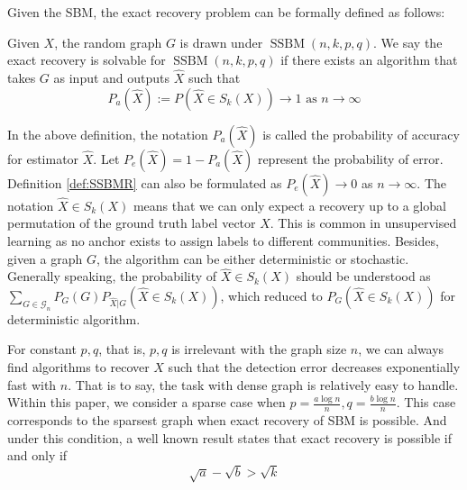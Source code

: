 \documentclass[entropy,article,submit,moreauthors,pdftex]{Definitions/mdpi}
\newcommand{\A}{\frac{a \log n}{n}}
\newcommand{\B}{\frac{b \log n}{n}}
\newcommand{\cG}{\mathcal{G}}
\newcommand{\1}{\mathbbm{1}}
\DeclareMathOperator{\SSBM}{SSBM}
\begin{document}
Given the SBM, the exact recovery problem can be formally defined as follows:
\begin{Definition} \label{def:SSBMR}
Given $X$, the random graph $G$ is drawn under $\SSBM(n,k,p,q)$. We say the exact recovery is solvable for $\SSBM(n,k,p,q)$ if there exists an algorithm that takes
$G$ as input and outputs $\hat{X}$ such that
\begin{equation*}
P_a(\hat{X}):=P(\hat{X} \in S_k(X)) \to 1 \textrm{ as } n \to \infty
\end{equation*}
\end{Definition}

In the above definition, the notation $P_a(\hat{X})$ is called the probability of accuracy for estimator $\hat{X}$.
Let $P_e(\hat{X}) = 1 - P_a(\hat{X})$ represent the probability of error. Definition \ref{def:SSBMR} can also
be formulated as $P_e(\hat{X}) \to 0$ as $n\to \infty$.
The notation $\hat{X} \in S_k(X)$ means that we can only
expect a recovery up to a global permutation of the ground truth label vector $X$. This is common in unsupervised
learning as no anchor exists to assign labels to different communities.
Besides, given a graph $G$, the algorithm can
be either deterministic or stochastic. Generally speaking, the probability of $\hat{X} \in S_k(X)$ should be understood as 
$\sum_{G \in \cG_n} P_G(G) P_{\hat{X}|G}(\hat{X} \in S_k(X))$, which reduced to 
$P_G(\hat{X} \in S_k(X))$ for deterministic algorithm.

For constant $p,q$, that is, $p,q$ is irrelevant with the graph size $n$,
we can always find algorithms to recover $X$ such that the detection error decreases exponentially
fast with $n$.
That is to say, the task with dense graph is relatively easy to handle. Within this paper, we consider a sparse
case when $p = \A, q = \B$. This case corresponds to the sparsest graph when exact recovery of SBM is possible.
And under this condition, a well known result \cite{abbe2015community} states that
exact recovery is possible if and only if
\begin{equation}\label{eq:abk}
\sqrt{a} - \sqrt{b} > \sqrt{k}
\end{equation}
\end{document}
